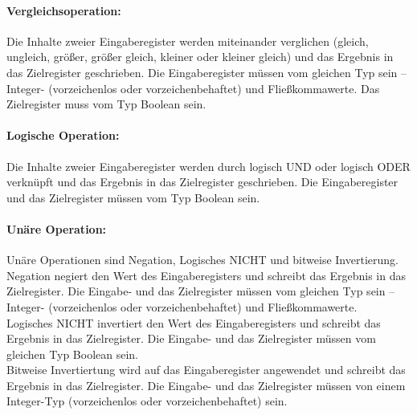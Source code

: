 \documentclass[twoside,a4paper,fleqn,12pt]{book}
\begin{document}
\paragraph{Vergleichsoperation:} Die Inhalte zweier Eingaberegister 
werden miteinander verglichen (gleich, ungleich, größer, größer gleich, kleiner oder kleiner gleich) und das Ergebnis in das Zielregister geschrieben.
Die Eingaberegister müssen vom gleichen Typ sein -- Integer- (vorzeichenlos oder vorzeichenbehaftet) und Fließkommawerte.
Das Zielregister muss vom Typ Boolean sein.

\paragraph{Logische Operation:} Die Inhalte zweier Eingaberegister werden durch logisch UND oder logisch ODER verknüpft und das Ergebnis in das Zielregister geschrieben.
Die Eingaberegister und das Zielregister müssen vom Typ Boolean sein.

\paragraph{Unäre Operation:} Unäre Operationen sind Negation, Logisches NICHT und bitweise Invertierung.
Negation negiert den Wert des Eingaberegisters und schreibt das Ergebnis in das Zielregister.
Die Eingabe- und das Zielregister müssen vom gleichen Typ sein -- Integer- (vorzeichenlos oder vorzeichenbehaftet) und Fließkommawerte.\\
Logisches NICHT invertiert den Wert des Eingaberegisters und schreibt das Ergebnis in das Zielregister.
Die Eingabe- und das Zielregister müssen vom gleichen Typ Boolean sein.\\
Bitweise Invertiertung wird auf das Eingaberegister angewendet und schreibt das Ergebnis in das Zielregister.
Die Eingabe- und das Zielregister müssen von einem Integer-Typ (vorzeichenlos oder vorzeichenbehaftet) sein.
\end{document}
